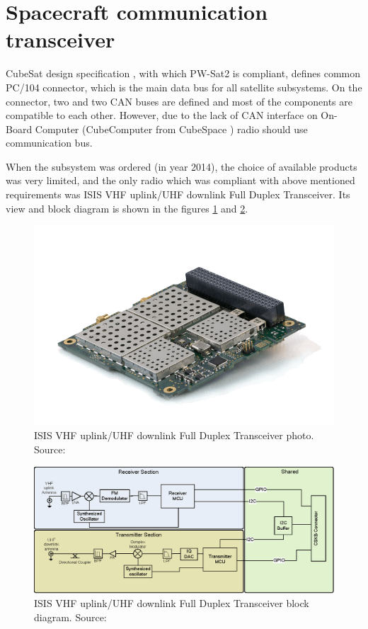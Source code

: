 \section{Spacecraft communication transceiver}
\label{section:comm_design}
CubeSat design specification \cite{cubesat_spec}, with which PW-Sat2 is compliant, defines common PC/104 connector, which is the main data bus for all satellite subsystems. On the connector, two \iic and two CAN buses are defined and most of the components are compatible to each other. However, due to the lack of CAN interface on On-Board Computer (CubeComputer from CubeSpace \cite{cubespace_website}) radio should use \iic communication bus.

When the subsystem was ordered (in year \si{2014}), the choice of available products was very limited, and the only radio which was compliant with above mentioned requirements was ISIS VHF uplink/UHF downlink Full Duplex Transceiver. Its view and block diagram is shown in the figures \ref{ISIS_TRXvU_photo} and \ref{ISIS_TRXvU_block_diagram}.

\begin{figure}
    \centering
    \includegraphics[width=0.5\paperwidth]{img/4/ISIS-radio-UHF-VHF-min.png}
    \caption{ISIS VHF uplink/UHF downlink Full Duplex Transceiver photo. Source: \cite{isis_trxvu}}
    \label{ISIS_TRXvU_photo}
\end{figure}

\begin{figure}
    \centering
    \includegraphics[width=0.8\paperwidth]{img/4/ISIS_TRXvU_block_diagram.eps}
    \caption{ISIS VHF uplink/UHF downlink Full Duplex Transceiver block diagram. Source: \cite{isis_trxvu}}
    \label{ISIS_TRXvU_block_diagram}
\end{figure}

